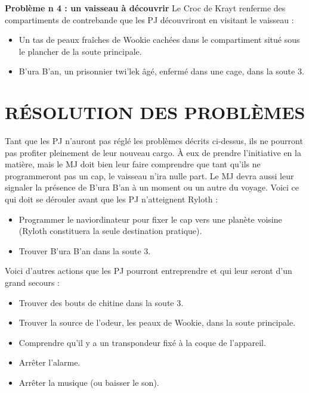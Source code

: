 \documentclass[a4paper,10pt,twoside,twocolumn,openany]{book}
\begin{document}
\textbf{Problème n 4 : un vaisseau à découvrir} Le Croc de
Krayt renferme des compartiments de contrebande que
les PJ découvriront en visitant le vaisseau :

\begin{itemize}
\item Un tas de peaux fraîches de Wookie cachées dans le compartiment situé sous le plancher de la soute
principale.
\item B’ura B’an, un prisonnier twi’lek âgé, enfermé dans une cage, dans la soute 3.
\end{itemize}

\section{RÉSOLUTION DES PROBLÈMES}

Tant que les PJ n’auront pas réglé les problèmes décrits
ci-dessus, ils ne pourront pas profiter pleinement de leur
nouveau cargo. À eux de prendre l’initiative en la matière, mais le MJ doit bien leur faire comprendre que tant
qu’ils ne programmeront pas un cap, le vaisseau n’ira
nulle part. Le MJ devra aussi leur signaler la présence de
B’ura B’an à un moment ou un autre du voyage.
Voici ce qui doit se dérouler avant que les PJ n’atteignent Ryloth :

\begin{itemize}
\item  Programmer le naviordinateur pour fixer le cap vers une planète voisine (Ryloth constituera la seule destination pratique).
\item Trouver B’ura B’an dans la soute 3.
\end{itemize}

Voici d’autres actions que les PJ pourront entreprendre et qui leur seront d’un grand secours :

\begin{itemize}

\item Trouver des bouts de chitine dans la soute 3.
\item Trouver la source de l’odeur, les peaux de Wookie, dans la soute principale.
\item Comprendre qu’il y a un transpondeur fixé à la coque de l’appareil.
\item Arrêter l’alarme.
\item Arrêter la musique (ou baisser le son).
\end{itemize}

\subtitle{UTILISATION DU NAVIORDINATEUR}
\end{document}
